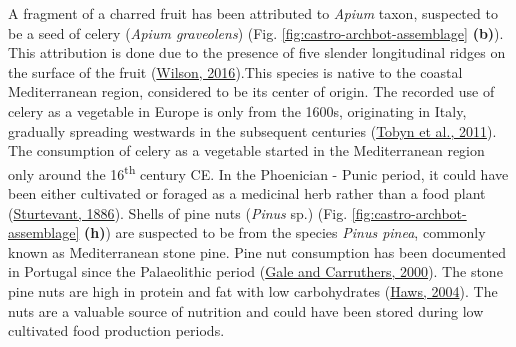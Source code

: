 \documentclass[3p]{elsarticle} %
\begin{document}
A fragment of a charred fruit has been attributed to \emph{Apium} taxon, suspected to be a seed of celery (\emph{Apium graveolens}) (Fig. \ref{fig:castro-archbot-assemblage} \textbf{(b)}). This attribution is done due to the presence of five slender longitudinal ridges on the surface of the fruit (\protect\hyperlink{ref-wilson16}{Wilson, 2016}).This species is native to the coastal Mediterranean region, considered to be its center of origin. The recorded use of celery as a vegetable in Europe is only from the 1600s, originating in Italy, gradually spreading westwards in the subsequent centuries (\protect\hyperlink{ref-tobyn_etal11}{Tobyn et al., 2011}). The consumption of celery as a vegetable started in the Mediterranean region only around the 16\textsuperscript{th} century CE. In the Phoenician - Punic period, it could have been either cultivated or foraged as a medicinal herb rather than a food plant (\protect\hyperlink{ref-sturtevant86}{Sturtevant, 1886}). Shells of pine nuts (\emph{Pinus} sp.) (Fig. \ref{fig:castro-archbot-assemblage} \textbf{(h)}) are suspected to be from the species \emph{Pinus pinea}, commonly known as Mediterranean stone pine. Pine nut consumption has been documented in Portugal since the Palaeolithic period (\protect\hyperlink{ref-gale_carruthers00}{Gale and Carruthers, 2000}). The stone pine nuts are high in protein and fat with low carbohydrates (\protect\hyperlink{ref-haws04}{Haws, 2004}). The nuts are a valuable source of nutrition and could have been stored during low cultivated food production periods.
\end{document}
